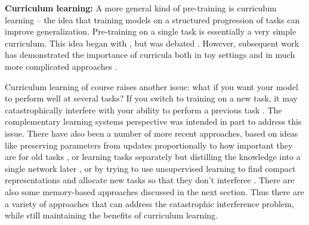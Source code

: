 \documentclass[11pt]{article}
\begin{document}
\textbf{Curriculum learning:} A more general kind of pre-training is curriculum learning \citep{Bengio2009} -- the idea that training models on a structured progression of tasks can improve generalization. Pre-training on a single task is essentially a very simple curriculum. This idea began with \citet{Elman1993}, but was debated \citep[e.g.]{Rohde1997}. However, subsequent work has demonstrated the importance of curricula both in toy settings \citep{Gulcehre2013} and in much more complicated approaches \citep[discussed below, for example]{Graves2016}. \par
Curriculum learning of course raises another issue: what if you want your model to perform well at several tasks? If you switch to training on a new task, it may catastrophically interfere with your ability to perform a previous task \citep{McCloskey1989}. The complementary learning systems perspective \citep{McClelland1995, Kumaran2016} was intended in part to address this issue. There have also been a number of more recent approaches, based on ideas like preserving parameters from updates proportionally to how important they are for old tasks \citep{Kirkpatrick2016}, or learning tasks separately but distilling the knowledge into a single network later \citep{Rusu2015}, or by trying to use unsupervised learning to find compact representations and allocate new tasks so that they don't interferee \citep{Achille2018a}. There are also some memory-based approaches discussed in the next section. Thus there are a variety of approaches that can address the catastrophic interference problem, while still maintaining the benefits of curriculum learning. \par
\end{document}
